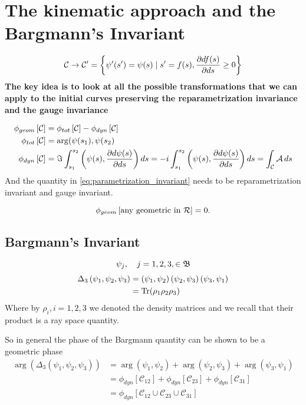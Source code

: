 \chapter{The kinematic approach and the Bargmann's Invariant}
\begin{equation}
\mathcal{C}\to\mathcal{C}'=\left\{\psi'(s')=\psi(s)\mid s'=f(s),\frac{\partial df(s)}{\partial ds}\geq 0 \right\}
\end{equation}
\textbf{The key idea is to look at all the possible transformations that we can apply to the initial curves preserving the reparametrization invariance and the gauge invariance}

\begin{align}
	\phi_{geom}\left[\mathcal{C} \right]&=\phi_{tot}\left[ \mathcal{C}\right]-\phi_{dyn}\left[\mathcal{C}\right]\label{eq:parametrization_invariant}\\
	\phi_{tot}\left[\mathcal{C}\right]&=\arg(\psi(s_1),\psi(s_2)\\
	\phi_{dyn}\left[\mathcal{C}\right]&=\Im\int_{s_1}^{s_2}\left(\psi(s),\frac{\partial d\psi(s)}{\partial ds}\right)\mathop{}\!d s=-i\int_{s_1}^{s_2}\left(\psi(s),\frac{\partial d\psi(s)}{\partial ds}\right)\mathop{}\!d s=\int_{\mathcal{C}}\mathcal{A}\mathop{}\!d s
\end{align}
And the quantity in \eqref{eq:parametrization_invariant} needs to be reparametrization invariant and gauge invariant.



\begin{equation}
\phi_{geom}\left[\text{any geometric in $ \mathcal{R} $} \right]=0.
\end{equation}
\section{Bargmann's Invariant}
\begin{equation}
\psi_{j},\quad j=1,2,3, \in \mathfrak{B}
\end{equation}
\begin{align}
\Delta_3\left(\psi_1,\psi_2,\psi_3\right)&=\left(\psi_1,\psi_2\right)\left(\psi_2,\psi_3\right)\left(\psi_3,\psi_1\right)\\
&=\mathrm{Tr}(\rho_1\rho_2\rho_3)
\end{align}
Where by $ \rho_i, i=1,2,3 $ we denoted the density matrices and we recall that their product is a ray space quantity.

So in general the phase of the Bargmann quantity can be shown to be a geometric phase
\begin{align}
	\arg(\Delta_3\left(\psi_1,\psi_2,\psi_3\right))&=\arg(\psi_1,\psi_2)+\arg(\psi_2,\psi_3)+\arg(\psi_3,\psi_1)\\
	&=\phi_{dyn}\left[\mathcal{C}_{12}\right]+\phi_{dyn}\left[\mathcal{C}_{23}\right]+\phi_{dyn}\left[\mathcal{C}_{31}\right]\\
	&=\phi_{dyn}\left[\mathcal{C}_{12}\cup\mathcal{C}_{23}\cup\mathcal{C}_{31} \right]
\end{align}